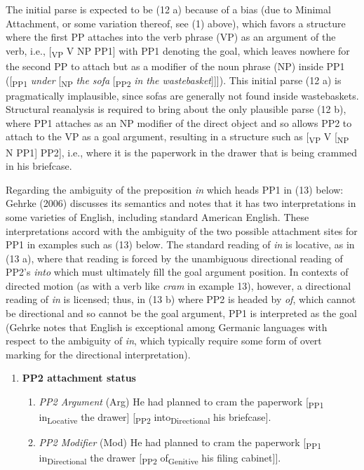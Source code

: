 \documentclass[11pt,oneside]{book}
\providecommand{\tightlist}{%
  \setlength{\itemsep}{0pt}\setlength{\parskip}{0pt}}
\begin{document}
The initial parse is expected to be (12 a) because of a bias (due to Minimal Attachment, or some variation thereof, see (1) above), which favors a structure where the first PP attaches into the verb phrase (VP) as an argument of the verb, i.e., {[}\textsubscript{VP} V NP PP1{]} with PP1 denoting the goal, which leaves nowhere for the second PP to attach but as a modifier of the noun phrase (NP) inside PP1 ({[}\textsubscript{PP1} \emph{under} {[}\textsubscript{NP} \emph{the sofa} {[}\textsubscript{PP2} \emph{in the wastebasket}{]}{]}{]}). This initial parse (12 a) is pragmatically implausible, since sofas are generally not found inside wastebaskets. Structural reanalysis is required to bring about the only plausible parse (12 b), where PP1 attaches as an NP modifier of the direct object and so allows PP2 to attach to the VP as a goal argument, resulting in a structure such as {[}\textsubscript{VP} V {[}\textsubscript{NP} N PP1{]} PP2{]}, i.e., where it is the paperwork in the drawer that is being crammed in his briefcase.

Regarding the ambiguity of the preposition \emph{in} which heads PP1 in (13) below: Gehrke (2006) discusses its semantics and notes that it has two interpretations in some varieties of English, including standard American English. These interpretations accord with the ambiguity of the two possible attachment sites for PP1 in examples such as (13) below. The standard reading of \emph{in} is locative, as in (13 a), where that reading is forced by the unambiguous directional reading of PP2's \emph{into} which must ultimately fill the goal argument position. In contexts of directed motion (as with a verb like \emph{cram} in example 13), however, a directional reading of \emph{in} is licensed; thus, in (13 b) where PP2 is headed by \emph{of}, which cannot be directional and so cannot be the goal argument, PP1 is interpreted as the goal (Gehrke notes that English is exceptional among Germanic languages with respect to the ambiguity of \emph{in}, which typically require some form of overt marking for the directional interpretation).

\begin{enumerate}
\def\labelenumi{(\arabic{enumi})}
\setcounter{enumi}{12}
\tightlist
\item
  \textbf{PP2 attachment status} \linebreak\nopagebreak

  \begin{enumerate}
  \def\labelenumii{(\alph{enumii})}
  \tightlist
  \item
    \emph{PP2 Argument} (Arg) \linebreak\nopagebreak
    He had planned to cram the paperwork {[}\textsubscript{PP1} in\textsubscript{Locative} the drawer{]} {[}\textsubscript{PP2} into\textsubscript{Directional} his briefcase{]}.
  \item
    \emph{PP2 Modifier} (Mod) \linebreak\nopagebreak
    He had planned to cram the paperwork {[}\textsubscript{PP1} in\textsubscript{Directional} the drawer {[}\textsubscript{PP2} of\textsubscript{Genitive} his filing cabinet{]}{]}.
  \end{enumerate}
\end{enumerate}
\end{document}

